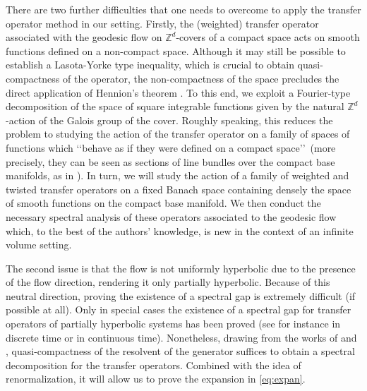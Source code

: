 \documentclass[11pt,letterpaper]{amsart}
\newcommand \Z {{ \mathbb Z}}
\theoremstyle{definition}
\begin{document}
There are two further difficulties that one needs to overcome to apply the transfer operator method in our setting.
Firstly, the (weighted) transfer operator associated with the geodesic flow on $\mathbb{Z}^d$-covers of a compact space acts on smooth functions defined on a non-compact space. Although it may still be possible to establish a Lasota-Yorke type inequality, which is crucial to obtain quasi-compactness of the operator, the non-compactness of the space precludes the direct application of Hennion's theorem \cite{Hen}. 
To this end, we exploit a Fourier-type decomposition of the space of square integrable functions given by the natural $\Z^d$-action of the Galois group of the cover. 
Roughly speaking, this reduces the problem to studying the action of the transfer operator on a family of spaces of functions which \lq\lq behave as if they were defined on a compact space\rq\rq\ (more precisely, they can be seen as sections of line bundles over the compact base manifolds, as in \cite{FlRa}).
In turn, we will study the action of a family of weighted and twisted transfer operators on a fixed Banach space containing densely the space of smooth functions on the compact base manifold. We then conduct the necessary spectral analysis of these operators associated to the geodesic flow which, to the best of the authors' knowledge, is new in the context of an infinite volume setting. 

The second issue is that the flow is not uniformly hyperbolic due to the presence of the flow direction, rendering it only partially hyperbolic. Because of this neutral direction, proving the existence of a spectral gap is extremely difficult (if possible at all). Only in special cases the existence of a spectral gap for transfer operators of partially hyperbolic systems has been proved (see for instance \cite{CaLi} in discrete time or \cite{Tsu} in continuous time).
Nonetheless, drawing from the works of \cite{Liv} and \cite{But}, quasi-compactness of the resolvent of the generator suffices to obtain a spectral decomposition for the transfer operators.
Combined with the idea of renormalization, it will allow us to prove the expansion in \eqref{eq:expan}.
\end{document}
